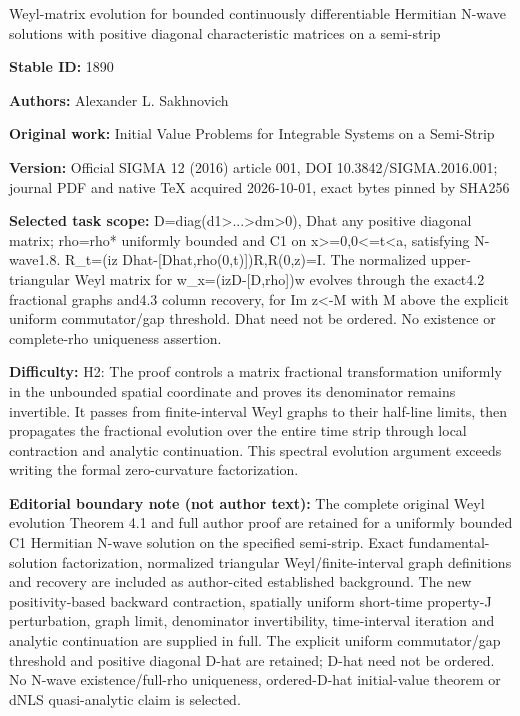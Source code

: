 \documentclass[11pt]{article}
\numberwithin{equation}{section}
\begin{document}
\begin{center}\Large Weyl-matrix evolution for bounded continuously differentiable Hermitian N-wave solutions with positive diagonal characteristic matrices on a semi-strip\end{center}
\noindent\textbf{Stable ID:} 1890\par
\noindent\textbf{Authors:} Alexander L. Sakhnovich\par
\noindent\textbf{Original work:} Initial Value Problems for Integrable Systems on a Semi-Strip\par
\noindent\textbf{Version:} Official SIGMA 12 (2016) article 001, DOI 10.3842/SIGMA.2016.001; journal PDF and native TeX acquired 2026-10-01, exact bytes pinned by SHA256\par
\noindent\textbf{Selected task scope:} D=\allowbreak{}diag(d1>...>dm>0), Dhat any positive diagonal matrix; rho=\allowbreak{}rho*\allowbreak{} uniformly bounded and C1 on x>=\allowbreak{}0,0<=\allowbreak{}t<a, satisfying N-wave1.8. R\_t=\allowbreak{}(iz Dhat-[Dhat,rho(0,t)])R,R(0,z)=\allowbreak{}I. The normalized upper-triangular Weyl matrix for w\_x=\allowbreak{}(izD-[D,rho])w evolves through the exact4.2 fractional graphs and4.3 column recovery, for Im z<-M with M above the explicit uniform commutator/gap threshold. Dhat need not be ordered. No existence or complete-rho uniqueness assertion.\par
\noindent\textbf{Difficulty:} H2: The proof controls a matrix fractional transformation uniformly in the unbounded spatial coordinate and proves its denominator remains invertible. It passes from finite-interval Weyl graphs to their half-line limits, then propagates the fractional evolution over the entire time strip through local contraction and analytic continuation. This spectral evolution argument exceeds writing the formal zero-curvature factorization.\par
\noindent\textbf{Editorial boundary note (not author text):} The complete original Weyl evolution Theorem 4.1 and full author proof are retained for a uniformly bounded C1 Hermitian N-wave solution on the specified semi-strip. Exact fundamental-solution factorization, normalized triangular Weyl/finite-interval graph definitions and recovery are included as author-cited established background. The new positivity-based backward contraction, spatially uniform short-time property-J perturbation, graph limit, denominator invertibility, time-interval iteration and analytic continuation are supplied in full. The explicit uniform commutator/gap threshold and positive diagonal D-hat are retained; D-hat need not be ordered. No N-wave existence/full-rho uniqueness, ordered-D-hat initial-value theorem or dNLS quasi-analytic claim is selected.\par
\end{document}
